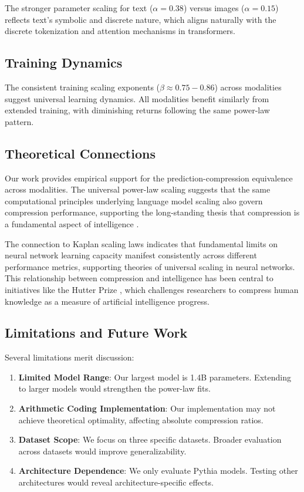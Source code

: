 \documentclass[11pt]{article}
\begin{document}
The stronger parameter scaling for text ($\alpha = 0.38$) versus images ($\alpha = 0.15$) reflects text's symbolic and discrete nature, which aligns naturally with the discrete tokenization and attention mechanisms in transformers.

\subsection{Training Dynamics}

The consistent training scaling exponents ($\beta \approx 0.75-0.86$) across modalities suggest universal learning dynamics. All modalities benefit similarly from extended training, with diminishing returns following the same power-law pattern.

\subsection{Theoretical Connections}

Our work provides empirical support for the prediction-compression equivalence across modalities. The universal power-law scaling suggests that the same computational principles underlying language model scaling also govern compression performance, supporting the long-standing thesis that compression is a fundamental aspect of intelligence \citep{legg2007universal}.

The connection to Kaplan scaling laws indicates that fundamental limits on neural network learning capacity manifest consistently across different performance metrics, supporting theories of universal scaling in neural networks. This relationship between compression and intelligence has been central to initiatives like the Hutter Prize \citep{hutter2006human}, which challenges researchers to compress human knowledge as a measure of artificial intelligence progress.

\subsection{Limitations and Future Work}

Several limitations merit discussion:

\begin{enumerate}
\item \textbf{Limited Model Range}: Our largest model is 1.4B parameters. Extending to larger models would strengthen the power-law fits.
\item \textbf{Arithmetic Coding Implementation}: Our implementation may not achieve theoretical optimality, affecting absolute compression ratios.
\item \textbf{Dataset Scope}: We focus on three specific datasets. Broader evaluation across datasets would improve generalizability.
\item \textbf{Architecture Dependence}: We only evaluate Pythia models. Testing other architectures would reveal architecture-specific effects.
\end{enumerate}
\end{document}
